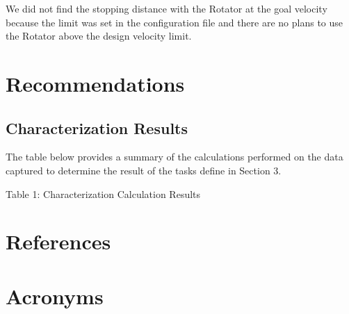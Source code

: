 \documentclass[SE,lsstdraft,authoryear,toc]{lsstdoc}
\begin{document}
We did not find the stopping distance with the Rotator at the goal
velocity because the limit was set in the configuration file and there
are no plans to use the Rotator above the design velocity limit.

\section{Recommendations}

\subsection{Characterization Results}

The table below provides a summary of the calculations performed on the
data captured to determine the result of the tasks define in Section 3.

Table 1: Characterization Calculation Results



\appendix
\section{References} \label{sec:bib}
\renewcommand{\refname}{} %


\section{Acronyms} \label{sec:acronyms}

\end{document}
